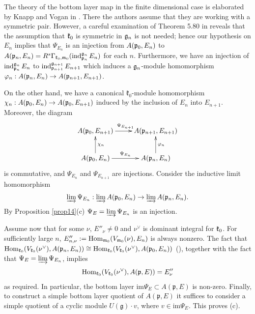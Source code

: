\documentclass[12pt]{article}
\newcommand {\romanV} {${\overline{\underline{\mathrm{V}}}}$}
\newcommand{\kk}{\mathfrak{k}}
\newcommand{\pp}{\mathfrak{p}}
\renewcommand{\gg}{\mathfrak{g}}
\renewcommand {\phi} {\varphi}
\newcommand{\refprop}[1]{Proposition \ref{#1}}
\def\Hom{\text{\rm Hom}}
\def\k{\frak k}
\begin{document}
\item[(c)]  The theory of the bottom layer map in the finite dimensional case is elaborated by Knapp and Vogan in \cite[Ch.\romanV, Sec.6]{KV}.  There the authors assume that they are working with a symmetric pair.  However, a careful examination of Theorem 5.80 in \cite{KV} reveals that the assumption that $\frak k_0$ is symmetric in $\frak g_n$ is not needed; hence our hypothesis on $E_n$ implies that $\Psi_{E_{n}}$ is an injection from $A(\frak p_0, E_n)$ to $A(\frak p_n, E_n)= R^s \Gamma_{\frak k_{0},\frak m_{0}} (\text{ind}^{\frak g_{n}}_{\frak p_{n}}\, E_n)$ for each $n$.  Furthermore, we have an injection of $\text{ind}^{\frak g_{n}}_{\frak p_{n}}\, E_n$ to $\text{ind}^{\frak g_{n+1}}_{\frak p_{n+1}}\, E_{n+1}$ which induces a $\frak g_n$-module homomorphism $\phi_n : A(\frak p_n, E_n)\to A(\frak p_{n+1}, E_{n+1})$.

On the other hand, we have a canonical $\kk_0$-module homomorphism $\chi_n :A(\frak p_0, E_n)\to A(\frak p_0, E_{n+1})$  induced by the inclusion of $E_n$ into $E_{n+1}$. Moreover, the diagram
\begin{equation}\label{eq8}
\xymatrix{
A(\frak p_0, E_{n+1}) \ar[r]^{\Psi_{E_{n+1}}}& A(\frak p_{n+1}, E_{n+1})  \\
A(\frak p_0, E_n) \ar[u]_{\chi_n}\ar[r]^{\Psi_{E_{n}}}&A(\frak p_n, E_n)\ar[u]_{\phi_n}}
\end{equation}
is commutative, and $\Psi_{E_{n}}$ and $\Psi_{E_{n+1}}$  are injections.  Consider the inductive limit homomorphism
$$
\varinjlim \Psi_{E_{n}} : \varinjlim A(\frak p_0, E_n)\to \varinjlim A(\frak p_n, E_n).
$$
By \refprop{prop14}(c) $\Psi_E = \varinjlim \Psi_{E_{n}}$ is an injection.

Assume now that for some $\nu$, $E''_\nu\neq 0$ and $\nu^{\vee}$ is dominant integral for $\k_0$.  For sufficiently large $n$, $E''_{n,\nu}:= \Hom_{{\frak m}_{0}}(V_{{\frak m}_{0}} (\nu), E_n)$ is always nonzero.  The fact that $\Hom_{\frak k_{0}} (V_{\frak k_{0}} (\nu^{\vee}), A(\frak p_n,E_n)) \cong \Hom_{\frak k_{0}} (V_{ \frak k_{0}}(\nu^{\vee}), A(\frak p_0, E_n))$ (\cite[Theorem 5.80]{KV}), together with the fact that $\Psi_E = \varinjlim \Psi_{E_{n}}$, implies
$$
\Hom_{\frak k_{0}}(V_{\frak k_{0}} (\nu^{\vee}), A(\frak p,E)) = E''_\nu
$$
as required. In particular, the bottom layer $\mathrm{im}  \Psi_E\subset A(\pp,E)$ is non-zero. Finally, to construct a simple bottom layer quotient of $A(\pp,E)$ it suffices to consider a simple quotient of a cyclic module $U(\gg)\cdot v$, where $v\in\mathrm{im}\Psi_E$. This proves (c).
\end{document}
